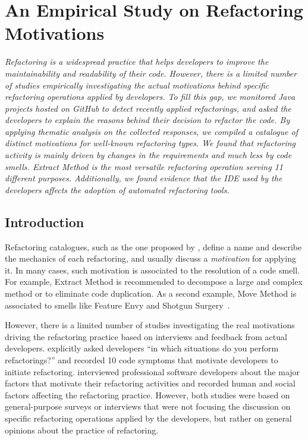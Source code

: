 \chapter{An Empirical Study on Refactoring Motivations}
\label{ChFse}

\noindent\textit{Refactoring is a widespread practice that helps developers to improve the maintainability and readability of their code.
However, there is a limited number of studies empirically investigating the actual motivations behind specific refactoring operations
applied by developers.
To fill this gap, we monitored Java projects hosted on GitHub to detect recently applied refactorings,
and asked the developers to explain the reasons behind their decision to refactor the code.
By applying thematic analysis on the collected responses,
we compiled a catalogue of \totalMotivationThemes distinct motivations for  well-known refactoring types. 
We found that refactoring activity is mainly driven by changes in the requirements and much less by code smells.
Extract Method is the most versatile refactoring operation serving 11 different purposes.
Additionally, we found evidence that the IDE used by the developers affects the adoption of automated refactoring tools.
}

\section{Introduction}

Refactoring catalogues, such as the one proposed by \cite{Fowler:1999}, define a name and describe the mechanics of each refactoring, and usually discuss a {\em motivation} for applying it. In many cases, such motivation is associated to the resolution of a code smell. For example, {\textsc Extract Method} is
recommended to decompose a large and complex method or to eliminate code
duplication. As a second example, {\textsc Move Method} is associated to smells like Feature Envy and Shotgun Surgery~\citep{Fowler:1999}.

However, there is a limited number of studies investigating the real motivations driving the refactoring practice based on interviews and feedback from actual developers.
\cite{kim-tse-2014} explicitly asked developers ``in which situations do you perform refactorings?'' and recorded 10 code symptoms that motivate developers to initiate refactoring.
\cite{Wang:2009} interviewed professional software developers about the
major factors that motivate their refactoring activities and recorded human and social factors affecting the refactoring practice.
However, both studies were based on general-purpose surveys or interviews that were not focusing the discussion on specific refactoring operations applied by the developers, but rather on general opinions about the practice of refactoring.

